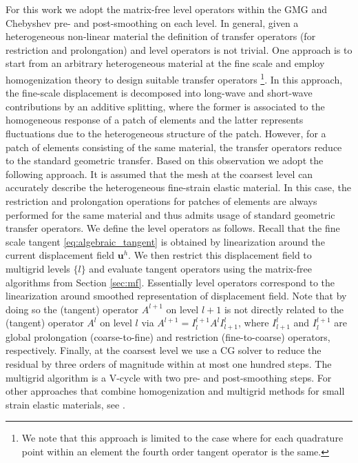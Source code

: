 \documentclass[preprint,12pt,times]{elsarticle}
\def\gz  #1{           \mbox{$\boldsymbol{#1}$}}
\begin{document}
For this work we adopt the matrix-free level operators within the GMG and Chebyshev pre- and post-smoothing on each level. In general, given a heterogeneous non-linear material the definition of transfer operators (for restriction and prolongation) and level operators is not trivial. One approach is to start from an arbitrary heterogeneous material at the fine scale and employ homogenization theory \cite{Suquet1985, Hill1972,Hashin1983,Castaneda1997} to design suitable transfer operators \cite{Miehe2007}\footnote{
  We note that this approach is limited to the case where for each quadrature point within an element the fourth order tangent operator is the same.
}.
In this approach, the fine-scale displacement is decomposed into long-wave and short-wave contributions by an additive splitting, where the former is associated to the homogeneous response of a patch of elements and the latter represents fluctuations due to the heterogeneous structure of the patch. However, for a patch of elements consisting of the same material, the transfer operators reduce to the standard geometric transfer. Based on this observation we adopt the following approach. It is assumed that the mesh at the coarsest level can accurately describe the heterogeneous fine-strain elastic material. In this case, the restriction and prolongation operations for patches of elements are always performed for the same material and thus admits usage of standard geometric transfer operators. We define the level operators as follows. Recall that the fine scale tangent \eqref{eq:algebraic_tangent} is obtained by linearization around the current displacement field $\gz u^h$. We then restrict this displacement field to multigrid levels $\{l\}$ and evaluate tangent operators using the matrix-free algorithms from Section \ref{sec:mf}. Essentially level operators correspond to the linearization around smoothed representation of displacement field.
Note that by doing so the (tangent) operator $A^{l+1}$ on level $l+1$ is not directly related to the (tangent) operator $A^{l}$ on level $l$ via $A^{l+1}=I^{l+1}_{l}  A^l I^l_{l+1}$, where $I^l_{l+1}$ and $I^{l+1}_l$ are global prolongation (coarse-to-fine) and restriction (fine-to-coarse) operators, respectively.
Finally, at the coarsest level we use a CG solver to reduce the residual by three orders of magnitude within at most one hundred steps.
The multigrid algorithm is a V-cycle with two pre- and post-smoothing steps. For other approaches that combine homogenization and multigrid methods for small strain elastic materials, see \cite{Bayreuther2003,Fish1995}.
\end{document}
